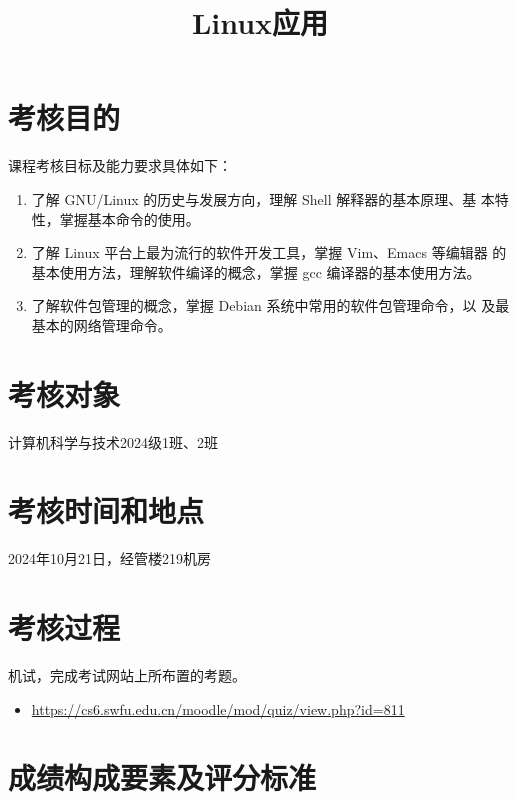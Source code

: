\documentclass{swfuassessment}
\title{Linux应用}
\begin{document}
\headone{}

\section{考核目的}
课程考核目标及能力要求具体如下：

\begin{enumerate}
\item 了解 GNU/Linux 的历史与发展方向，理解 Shell 解释器的基本原理、基
  本特性，掌握基本命令的使用。
\item 了解 Linux 平台上最为流行的软件开发工具，掌握 Vim、Emacs 等编辑器
  的基本使用方法，理解软件编译的概念，掌握 gcc 编译器的基本使用方法。
\item 了解软件包管理的概念，掌握 Debian 系统中常用的软件包管理命令，以
  及最基本的网络管理命令。
\end{enumerate}

\section{考核对象}

计算机科学与技术2024级1班、2班

\section{考核时间和地点}

2024年10月21日，经管楼219机房

\section{考核过程}

机试，完成考试网站上所布置的考题。

\begin{itemize}
\item \url{https://cs6.swfu.edu.cn/moodle/mod/quiz/view.php?id=811}
\end{itemize}

\section{成绩构成要素及评分标准}
\end{document}
